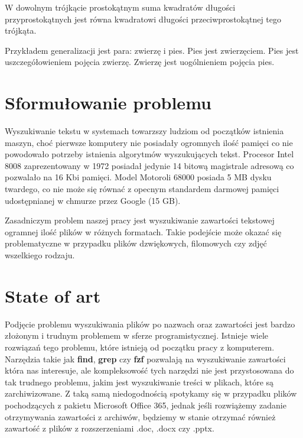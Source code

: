 \begin{Theorem}[Pitagorasa]\label{t:pitagoras}
W dowolnym trójkącie prostokątnym suma kwadratów długości przyprostokątnych jest równa kwadratowi długości przeciwprostokątnej tego trójkąta. 
\end{Theorem}

\begin{Example}[generalizacja]\label{ex:generalizacja}
Przykładem generalizacji jest para: zwierzę i pies. Pies jest zwierzęciem. Pies jest uszczegółowieniem pojęcia zwierzę. Zwierzę jest uogólnieniem pojęcia pies.
\end{Example}
\section{Sformułowanie problemu}
Wyszukiwanie tekstu w systemach towarzszy ludziom od początków istnienia maszyn,
choć pierwsze komputery nie posiadały ogromnych ilość pamięci co nie powodowało
potrzeby istnienia algorytmów wyszukujących tekst. Procesor Intel 8008 
zaprezentowany w 1972 posiadał jedynie 14 bitową magistrale adresową co 
pozwalało na 16 Kbi pamięci. Model Motoroli 68000 posiada 5 MB dysku twardego,
co nie może się równać z opecnym standardem darmowej pamięci udostępnianej w 
chmurze przez Google (15 GB).

Zasadniczym problem naszej pracy jest wyszukiwanie zawartości tekstowej
ogramnej ilość plików w różnych formatach. Takie podejście może okazać się 
problematyczne w przypadku plików dzwiękowych, filomowych czy zdjęć wszelkiego
rodzaju.

\section{State of art}

Podjęcie problemu wyszukiwania plików po nazwach oraz zawartości jest bardzo
złożonym i trudnym problemem w sferze programistycznej. Istnieje wiele rozwiązań
tego problemu, które istnieją od początku pracy z komputerem. Narzędzia takie
jak \textbf{find}, \textbf{grep} czy \textbf{fzf} \cite{bib:internet:Fzf} pozwalają na wyszukiwanie
zawartości która nas interesuje, ale kompleksowość tych narzędzi nie jest 
przystosowana do tak trudnego problemu, jakim jest wyszukiwanie treści w plikach,
które są zarchiwizowane. Z taką samą niedogodnością spotykamy się w przypadku
plików pochodzących z pakietu Microsoft Office 365, jednak jeśli rozwiążemy 
zadanie otrzymywania zawartości z archiwów, będziemy w stanie otrzymać również 
zawartość z plików z rozszerzeniami .doc, .docx czy .pptx.

